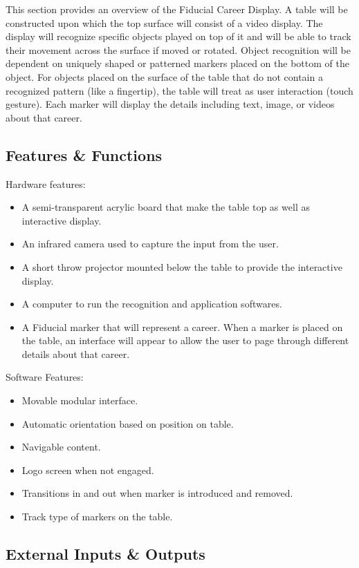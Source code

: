 This section provides an overview of the Fiducial Career Display. A table will be constructed upon which the top surface will consist of a video display. The display will recognize specific objects played on top of it and will be able to track their movement across the surface if moved or rotated. Object recognition will be dependent on uniquely shaped or patterned markers placed on the bottom of the object. For objects placed on the surface of the table that do not contain a recognized pattern (like a fingertip), the table will treat as user interaction (touch gesture). Each marker will display the details including text, image, or videos about that career.
\subsection{Features \& Functions}
Hardware features:
\begin{itemize}
\item A semi-transparent acrylic board that make the table top as well as interactive display.
\item An infrared camera used to capture the input from the user.
\item A short throw projector mounted below the table to provide the interactive display.
\item A computer to run the recognition and application softwares.
\item A Fiducial marker that will represent a career. When a marker is placed on the table, an interface will appear to allow the user to page through different details about that career.
\end{itemize}


Software Features:
\begin{itemize}
\item Movable modular interface.
\item Automatic orientation based on position on table.
\item Navigable content.
\item Logo screen when not engaged.
\item Transitions in and out when marker is introduced and removed.
\item Track type of markers on the table.
\end{itemize}

\subsection{External Inputs \& Outputs}

